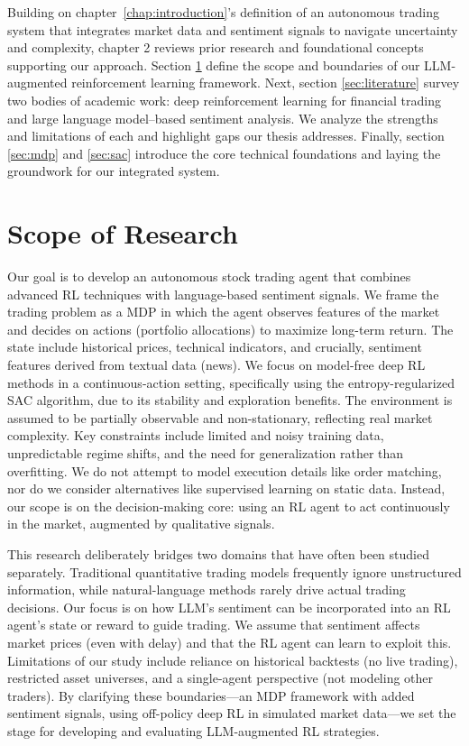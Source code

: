 Building on chapter \ref{chap:introduction}'s definition of an autonomous trading system that integrates market data and sentiment signals to navigate uncertainty and complexity, chapter 2 reviews prior research and foundational concepts supporting our approach. Section \ref{sec:scope} define the scope and boundaries of our \gls{LLM}-augmented reinforcement learning framework.  Next, section \ref{sec:literature} survey two bodies of academic work: deep reinforcement learning for financial trading and large language model–based sentiment analysis.  We analyze the strengths and limitations of each and highlight gaps our thesis addresses. Finally, section \ref{sec:mdp} and \ref{sec:sac} introduce the core technical foundations and laying the groundwork for our integrated system.

\section{Scope of Research}
\label{sec:scope}
Our goal is to develop an autonomous stock trading agent that combines advanced \gls{RL} techniques with language-based sentiment signals.  We frame the trading problem as a \gls{MDP} in which the agent observes features of the market and decides on actions (portfolio allocations) to maximize long-term return. The state include historical prices, technical indicators, and crucially, sentiment features derived from textual data (news).  We focus on model-free deep \gls{RL} methods in a continuous-action setting, specifically using the entropy-regularized \gls{SAC} algorithm, due to its stability and exploration benefits.  The environment is assumed to be partially observable and non-stationary, reflecting real market complexity. Key constraints include limited and noisy training data, unpredictable regime shifts, and the need for generalization rather than overfitting.  We do not attempt to model execution details like order matching, nor do we consider alternatives like supervised learning on static data.  Instead, our scope is on the decision-making core: using an RL agent to act continuously in the market, augmented by qualitative signals.

This research deliberately bridges two domains that have often been studied separately.  Traditional quantitative trading models frequently ignore unstructured information, while natural-language methods rarely drive actual trading decisions.  Our focus is on how \gls{LLM}'s sentiment can be incorporated into an \gls{RL} agent's state or reward to guide trading.  We assume that sentiment affects market prices (even with delay) and that the \gls{RL} agent can learn to exploit this. Limitations of our study include reliance on historical backtests (no live trading), restricted asset universes, and a single-agent perspective (not modeling other traders). By clarifying these boundaries—an \gls{MDP} framework with added sentiment signals, using off-policy deep \gls{RL} in simulated market data—we set the stage for developing and evaluating \gls{LLM}-augmented RL strategies.

